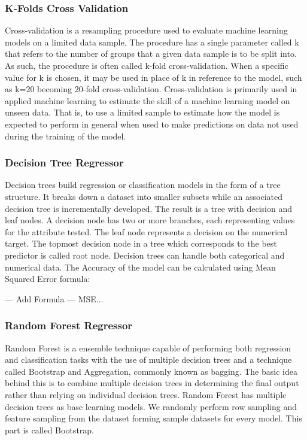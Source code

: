 \documentclass[conference]{IEEEtran}
\begin{document}
\subsubsection{K-Folds Cross Validation}
Cross-validation is a resampling procedure used to evaluate machine learning models on a limited data sample.
The procedure has a single parameter called k that refers to the number of groups that a given data sample is to be split into. As such, the procedure is often called k-fold cross-validation.
When a specific value for k is chosen, it may be used in place of k in reference to the model, such as k=20 becoming 20-fold cross-validation.
Cross-validation is primarily used in applied machine learning to estimate the skill of a machine learning model on unseen data.
That is, to use a limited sample to estimate how the model is expected to perform in general when used to make predictions on data not used during the training of the model.

\subsubsection{Decision Tree Regressor}
Decision trees build regression or classification models in the form of a tree structure.
It breaks down a dataset into smaller subsets while an associated decision tree is incrementally developed.
The result is a tree with decision and leaf nodes.
A decision node has two or more branches, each representing values for the attribute tested.
The leaf node represents a decision on the numerical target.
The topmost decision node in a tree which corresponds to the best predictor is called root node.
Decision trees can handle both categorical and numerical data.
The Accuracy of the model can be calculated using Mean Squared Error formula:

--- Add Formula --- MSE...

\subsubsection{Random Forest Regressor}
Random Forest is a ensemble technique capable of performing both regression and classification tasks with the use of multiple decision trees and a technique called Bootstrap and Aggregation, commonly known as bagging.
The basic idea behind this is to combine multiple decision trees in determining the final output rather than relying on individual decision trees.
Random Forest has multiple decision trees as base learning models.
We randomly perform row sampling and feature sampling from the dataset forming sample datasets for every model.
This part is called Bootstrap.
\end{document}
